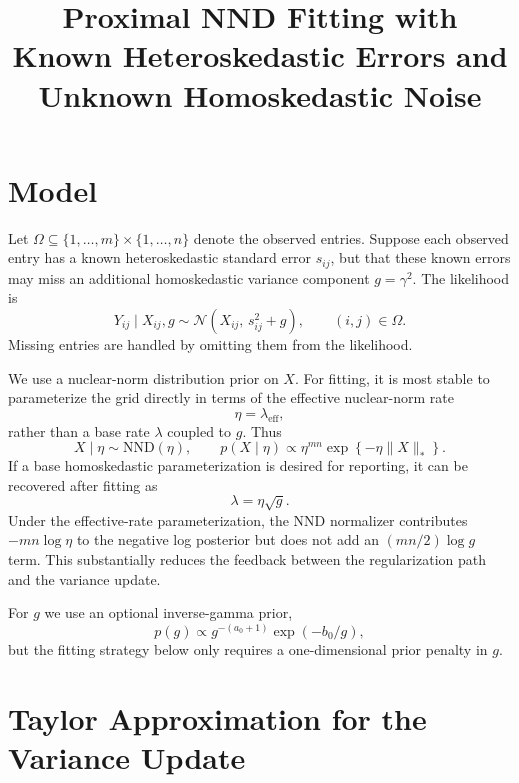 \documentclass[11pt]{article}
\title{Proximal NND Fitting with Known Heteroskedastic Errors and Unknown Homoskedastic Noise}
\author{}
\date{}
\begin{document}
\maketitle

\section{Model}

Let $\Omega \subseteq \{1,\ldots,m\}\times\{1,\ldots,n\}$ denote the observed
entries.  Suppose each observed entry has a known heteroskedastic standard error
$s_{ij}$, but that these known errors may miss an additional homoskedastic
variance component $g=\gamma^2$.  The likelihood is
\begin{equation}
    Y_{ij}\mid X_{ij}, g
        \sim \mathcal{N}\!\left(X_{ij},\, s_{ij}^2 + g\right),
        \qquad (i,j)\in\Omega .
\end{equation}
Missing entries are handled by omitting them from the likelihood.

We use a nuclear-norm distribution prior on $X$.  For fitting, it is most stable
to parameterize the grid directly in terms of the effective nuclear-norm rate
\[
    \eta = \lambda_{\mathrm{eff}},
\]
rather than a base rate $\lambda$ coupled to $g$.  Thus
\begin{equation}
    X\mid \eta
        \sim \mathrm{NND}(\eta),
        \qquad
    p(X\mid \eta)
        \propto
        \eta^{mn}
        \exp\!\left\{
            -\eta\|X\|_*
        \right\}.
\end{equation}
If a base homoskedastic parameterization is desired for reporting, it can be
recovered after fitting as
\begin{equation}
    \lambda = \eta\sqrt{g}.
\end{equation}
Under the effective-rate parameterization, the NND normalizer contributes
$-mn\log\eta$ to the negative log posterior but does not add an
$(mn/2)\log g$ term.  This substantially reduces the feedback between the
regularization path and the variance update.

For $g$ we use an optional inverse-gamma prior,
\begin{equation}
    p(g) \propto g^{-(a_0+1)}\exp(-b_0/g),
\end{equation}
but the fitting strategy below only requires a one-dimensional prior penalty in
$g$.

\section{Taylor Approximation for the Variance Update}
\end{document}
